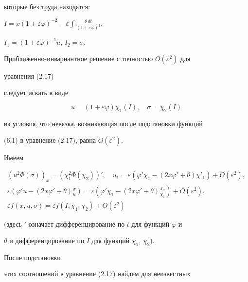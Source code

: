которые без труда находятся:


$I=x(1+\varepsilon\varphi)^{-2}-\varepsilon\int 


\frac{\theta\,dt}{(1+\varepsilon\varphi)^3}$, 


$I_1=(1+\varepsilon\varphi)^{-1}u$, $I_2=\sigma$. 


 


Приближенно-инвариантное решение с точностью $O(\varepsilon^2)$ для 


уравнения (2.17) 


следует искать в виде 


\begin{equation} 


u=(1+\varepsilon\varphi)\chi_1(I),\quad 


\sigma=\chi_2(I) \tag{6.1}


\end{equation} 


из условия, что невязка, возникающая после подстановки функций 


(6.1) в уравнение (2.17), равна $O(\varepsilon^2)$. 


Имеем 


\begin{gather*} 


(u^2\Phi(\sigma))_x=(\chi^2_1\Phi(\chi_2))',\quad 


u_t=\varepsilon(\varphi'\chi_1-(2x\varphi'+\theta)\chi'_1)+ 


O(\varepsilon^2),\\ 


\varepsilon(\varphi'u-(2x\varphi'+\theta)\tfrac{\sigma}{u})= 


\varepsilon(\varphi'\chi_1-(2x\varphi'+\theta)\tfrac{\chi_2}{\chi_1}) 


+O(\varepsilon^2),\\ 


\varepsilon f(x,u,\sigma)=\varepsilon f(I,\chi_1,\chi_2)+ 


O(\varepsilon^2) 


\end{gather*} 


(здесь ${}'$ означает дифференцирование по $t$ для функций $\varphi$ и 


$\theta$ и дифференцирование по $I$ для функций $\chi_1$, $\chi_2$). 


После подстановки 


этих соотношений в уравнение (2.17) найдем для неизвестных 


